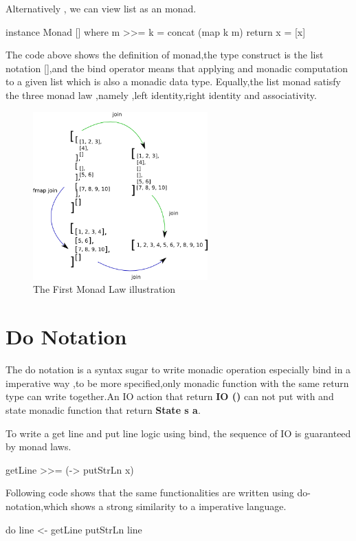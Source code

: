 Alternatively , we can view list as an monad.
\begin{hcode}
instance  Monad []  where
  m >>= k  = concat (map k m)
  return x = [x]
\end{hcode}

The code above shows the definition of monad,the type construct is the list notation [],and the bind operator means that applying and monadic computation to a given list which is also a monadic data type. Equally,the list monad satisfy the three monad law ,namely ,left identity,right identity and associativity.\\

\begin{figure}[H]
  \centering
	\includegraphics[width=0.60\textwidth]{pic/c3/list_monad.png}
	\caption{The First Monad Law illustration}
\end{figure} %



\section{Do Notation }
The do notation is a syntax sugar to write monadic operation especially bind in a imperative way ,to be more specified,only monadic function with the same return type can write together.An IO action that return \textbf{IO ()} can not put with and state monadic function that return \textbf{State s a}.

To write a get line and put line logic using bind, the sequence of IO is guaranteed by monad laws.
\begin{hcode}
 getLine >>= (\x -> putStrLn x)
\end{hcode}


Following code shows that the same functionalities are written using do-notation,which shows a strong similarity to a imperative language.
\begin{hcode}
do line <- getLine 
   putStrLn line
\end{hcode}

